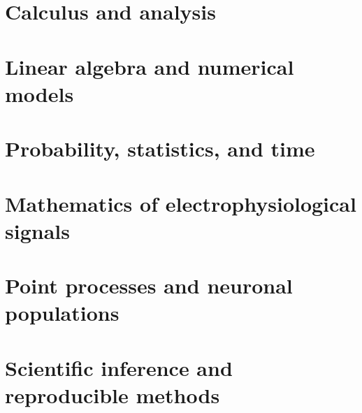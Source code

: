 \documentclass[11pt,a4paper,oneside,openany]{book}
\numberwithin{equation}{chapter}
\theoremstyle{definition}
\begin{document}
\part{Calculus and analysis}





\part{Linear algebra and numerical models}




\part{Probability, statistics, and time}




\part{Mathematics of electrophysiological signals}







\part{Point processes and neuronal populations}




\part{Scientific inference and reproducible methods}



\appendix



\backmatter

\end{document}
